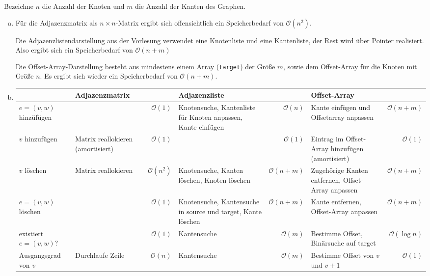 \documentclass{scrartcl}
\renewcommand{\O}{\mathcal O}
\begin{document}
Bezeichne $n$ die Anzahl der Knoten und $m$ die Anzahl der Kanten des Graphen.
\begin{enumerate}[(a)]
	\item
		Für die Adjazenzmatrix als $n\times n$-Matrix ergibt sich offensichtlich ein Speicherbedarf von $\mathcal O(n^2)$.

		Die Adjazenzlistendarstellung aus der Vorlesung verwendet eine Knotenliste und eine Kantenliste, der Rest wird über Pointer realisiert. Also ergibt sich ein Speicherbedarf von $\mathcal O(n+m)$

		Die Offset-Array-Darstellung besteht aus mindestens einem Array (\verb|target|) der Größe $m$, sowie dem Offset-Array für die Knoten mit Größe $n$. Es ergibt sich wieder ein Speicherbedarf von $\mathcal O(n+m)$.
	\item
		\begin{tabular}{p{2cm}|p{2cm}r|p{3cm}r|p{3cm}r|}
			&Adjazenzmatrix&&Adjazenzliste&&Offset-Array\\
			\hline
			$e=(v,w)$ hinzüfügen&
			&$\O(1)$&
			Knotensuche, Kantenliste für Knoten anpassen, Kante einfügen&$\O(n)$&
			Kante einfügen und Offsetarray anpassen&$\O(n+m)$
			\\\hline
			$v$ hinzufügen&
			Matrix reallokieren (amortisiert)&$\O(1)$&
			&$\O(1)$&
			Eintrag im Offset-Array hinzufügen (amortisiert)&$\O(1)$
			\\\hline
			$v$ löschen&
			Matrix reallokieren&$\O(n^2)$&
			Knotensuche, Kanten löschen, Knoten löschen&$\O(n+m)$&
			Zugehörige Kanten entfernen, Offset-Array anpassen &$\O(n+m)$
			\\\hline
			$e=(v,w)$ löschen&
			&$\O(1)$&
			Knotensuche, Kantensuche in source und target, Kante löschen&$\O(n+m)$&
			Kante entfernen, Offset-Array anpassen &$\O(n+m)$
			\\\hline
			existiert $e=(v,w)$?&
			&$\O(1)$&
			Kantensuche & $\O(m)$&
			Bestimme Offset, Binärsuche auf target & $\O(\log n)$
			\\\hline
			Ausgangsgrad von $v$&
			Durchlaufe Zeile&$\O(n)$&
			Kantensuche&$\O(m)$&
			Bestimme Offset von $v$ und $v+1$&$\O(1)$
		\end{tabular}


\end{enumerate}
\end{document}
